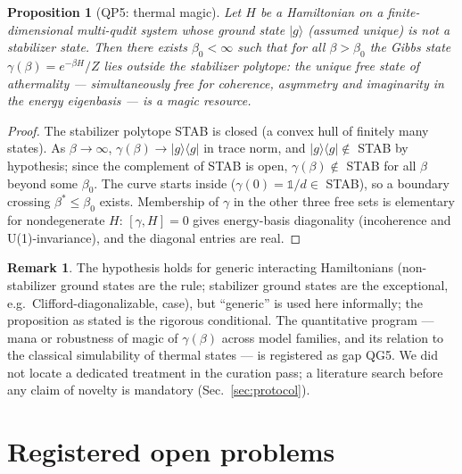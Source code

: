 \documentclass[11pt,a4paper]{article}
\newtheorem{proposition}{Proposition}
\theoremstyle{definition}
\newtheorem{remark}{Remark}
\newcommand{\ket}[1]{\lvert #1 \rangle}
\newcommand{\proj}[1]{\lvert #1 \rangle\!\langle #1 \rvert}
\newcommand{\id}{\mathbb{1}}
\begin{document}
\begin{proposition}[QP5: thermal magic]\label{prop:qp5}
Let $H$ be a Hamiltonian on a finite-dimensional multi-qudit system whose
ground state $\ket{g}$ (assumed unique) is not a stabilizer state. Then there
exists $\beta_0<\infty$ such that for all $\beta>\beta_0$ the Gibbs state
$\gamma(\beta)=e^{-\beta H}/Z$ lies outside the stabilizer polytope: the
unique free state of athermality --- simultaneously free for coherence,
asymmetry and imaginarity in the energy eigenbasis --- is a magic resource.
\end{proposition}
\begin{proof}
The stabilizer polytope STAB is closed (a convex hull of finitely many
states). As $\beta\to\infty$, $\gamma(\beta)\to\proj{g}$ in trace norm, and
$\proj{g}\notin$ STAB by hypothesis; since the complement of STAB is open,
$\gamma(\beta)\notin$ STAB for all $\beta$ beyond some $\beta_0$. The curve
starts inside ($\gamma(0)=\id/d\in$ STAB), so a boundary crossing
$\beta^*\le\beta_0$ exists. Membership of $\gamma$ in the other three free
sets is elementary for nondegenerate $H$: $[\gamma,H]=0$ gives energy-basis
diagonality (incoherence and U(1)-invariance), and the diagonal entries are
real.
\end{proof}

\begin{remark}
The hypothesis holds for generic interacting Hamiltonians (non-stabilizer
ground states are the rule; stabilizer ground states are the exceptional,
e.g.\ Clifford-diagonalizable, case), but ``generic'' is used here
informally; the proposition as stated is the rigorous conditional. The
quantitative program --- mana or robustness of magic of $\gamma(\beta)$
across model families, and its relation to the classical simulability of
thermal states --- is registered as gap QG5. We did not locate a dedicated
treatment in the curation pass; a literature search before any claim of
novelty is mandatory (Sec.~\ref{sec:protocol}).
\end{remark}

\section{Registered open problems}\label{sec:open}
\end{document}

